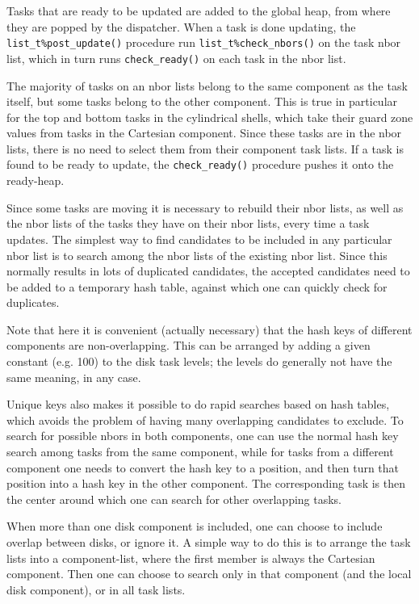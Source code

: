 \documentclass[paper=a4,fontsize=11pt]{scrartcl}
\numberwithin{equation}{section}		%
\numberwithin{figure}{section}			%
\numberwithin{table}{section}				%
\begin{document}
Tasks that are ready to be updated are added to the global heap, from where they are popped by the dispatcher.  When a task is done updating, the \verb:list_t%post_update(): procedure run \verb:list_t%check_nbors(): on the task nbor list, which in turn runs \verb:check_ready(): on each task in the nbor list.

The majority of tasks on an nbor lists belong to the same component as the task itself, but some tasks belong to the other component.  This is true in particular for the top and bottom tasks in the cylindrical shells, which take their guard zone values from tasks in the Cartesian component.  Since these tasks are in the nbor lists, there is no need to select them from their component task lists.  If a task is found to be ready to update, the \verb:check_ready(): procedure pushes it onto the ready-heap.

Since some tasks are moving it is necessary to rebuild their nbor lists, as well as the nbor lists of the tasks they have on their nbor lists, every time a task updates.  The simplest way to find candidates to be included in any particular nbor list is to search among the nbor lists of the existing nbor list.  Since this normally results in lots of duplicated candidates, the accepted candidates need to be added to a temporary hash table, against which one can quickly check for duplicates.

Note that here it is convenient (actually necessary) that the hash keys of different components are non-overlapping.    This can be arranged by adding a given constant (e.g. 100) to the disk task levels; the levels do generally not have the same meaning, in any case.

Unique keys also makes it possible to do rapid searches based on hash tables, which avoids the problem of having many overlapping candidates to exclude. To search for possible nbors in both components, one can use the normal hash key search among tasks from the same component, while for tasks from a different component one needs to convert the hash key to a position, and then turn that position into a hash key in the other component.  The corresponding task is then the center around which one can search for other overlapping tasks.

When more than one disk component is included, one can choose to include overlap between disks, or ignore it.  A simple way to do this is to arrange the task lists into a component-list, where the first member is always the Cartesian component.  Then one can choose to search only in that component (and the local disk component), or in all task lists.
\end{document}
